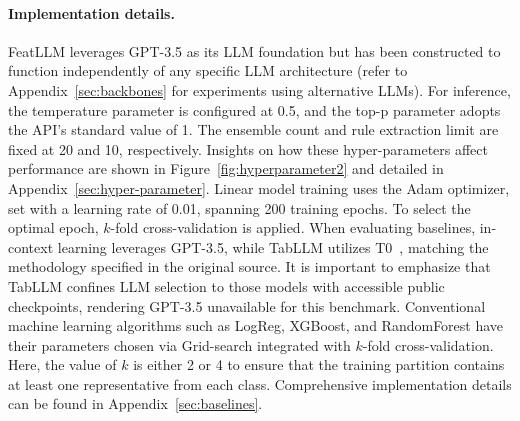 \vspace*{-0.12in}
\paragraph{Implementation details.}
\textsf{FeatLLM} leverages GPT-3.5 as its LLM foundation but has been constructed to function independently of any specific LLM architecture (refer to Appendix~\ref{sec:backbones} for experiments using alternative LLMs). For inference, the temperature parameter is configured at 0.5, and the top-p parameter adopts the API's standard value of 1. The ensemble count and rule extraction limit are fixed at 20 and 10, respectively. Insights on how these hyper-parameters affect performance are shown in Figure~\ref{fig:hyperparameter2} and detailed in Appendix~\ref{sec:hyper-parameter}. Linear model training uses the Adam optimizer, set with a learning rate of 0.01, spanning 200 training epochs. To select the optimal epoch, $k$-fold cross-validation is applied. When evaluating baselines, in-context learning leverages GPT-3.5, while TabLLM utilizes T0~\cite{sanh2022multitask}, matching the methodology specified in the original source. It is important to emphasize that TabLLM confines LLM selection to those models with accessible public checkpoints, rendering GPT-3.5 unavailable for this benchmark. Conventional machine learning algorithms such as LogReg, XGBoost, and RandomForest have their parameters chosen via Grid-search integrated with $k$-fold cross-validation. Here, the value of $k$ is either 2 or 4 to ensure that the training partition contains at least one representative from each class. Comprehensive implementation details can be found in Appendix~\ref{sec:baselines}.

\vspace*{-0.12in}

